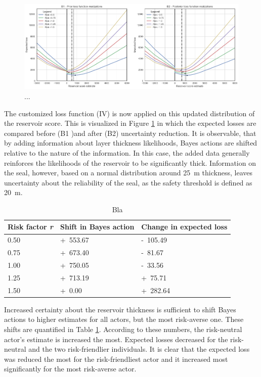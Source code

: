 	\begin{figure}[h]
		\centering
		\includegraphics[width=1\textwidth]{Figures/update_moderate3.png}
		\caption{...}\label{fig:update_moderate3} 
	\end{figure}
	
	The customized loss function (IV) is now applied on this updated distribution of the reservoir score. This is visualized in Figure \ref{fig:update_moderate3} in which the expected losses are compared before (B1 )and after (B2) uncertainty reduction. It is observable, that by adding information about layer thickness likelihoods, Bayes actions are shifted relative to the nature of the information. In this case, the added data generally reinforces the likelihoods of the reservoir to be significantly thick. Information on the seal, however, based on a normal distribution around 25~m thickness, leaves uncertainty about the reliability of the seal, as the safety threshold is defined as 20~m. 
	
	\begin{table}
		\centering
		\begin{tabular}[c]{| l | l | l |}
			\hline
			Risk factor \textit{r} & Shift in Bayes action & Change in expected loss \\ \hline
			0.50 & +~553.67 & -~105.49 \\ 
			0.75 & +~673.40 & -~81.67  \\ 
			1.00 & +~750.05 & -~33.56 \\ 
			1.25 & +~713.19 & +~75.71 \\ 
			1.50 & +~0.00 & +~282.64  \\ 
			\hline
		\end{tabular}
		\caption{Bla}
		\label{tab:update_moderate_tab}
	\end{table}
	
	Increased certainty about the reservoir thickness is sufficient to shift Bayes actions to higher estimates for all actors, but the most risk-averse one. These shifts are quantified in Table \ref{tab:update_moderate_tab}. According to these numbers, the risk-neutral actor's estimate is increased the most. Expected losses decreased for the risk-neutral and the two risk-friendlier individuals. It is clear that the expected loss was reduced the most for the risk-friendliest actor and it increased most significantly for the most risk-averse actor.
	
